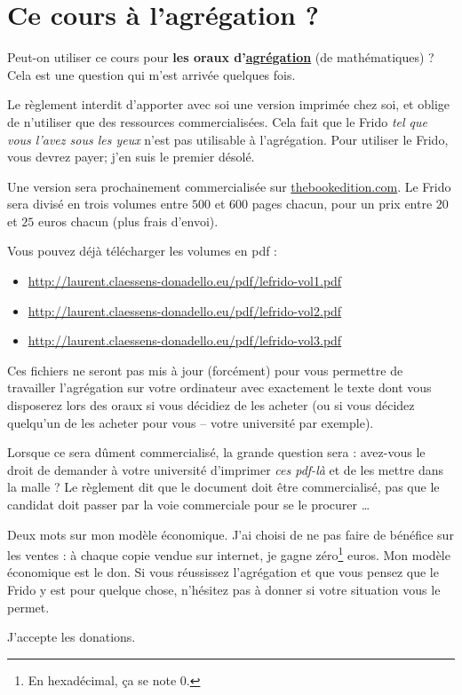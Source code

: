 
\section*{Ce cours à l'agrégation ?}

Peut-on utiliser ce cours pour \textbf{les oraux d'\href{http://agreg.org/}{agrégation}} (de mathématiques) ?  Cela est une question qui m'est arrivée quelques fois.  

Le règlement interdit d'apporter avec soi une version imprimée chez soi, et oblige de n'utiliser que des ressources commercialisées. Cela fait que le Frido \emph{tel que vous l'avez sous les yeux} n'est pas utilisable à l'agrégation. Pour utiliser le Frido, vous devrez payer; j'en suis le premier désolé.

Une version sera prochainement commercialisée sur \href{http://www.thebookedition.com/fr/}{thebookedition.com}. Le Frido sera divisé en trois volumes entre \( 500\) et \( 600\) pages chacun, pour un prix entre \( 20\) et \( 25\) euros chacun (plus frais d'envoi).

Vous pouvez déjà télécharger les volumes en pdf :
\begin{itemize}
    \item 
 \url{http://laurent.claessens-donadello.eu/pdf/lefrido-vol1.pdf}
    \item 
 \url{http://laurent.claessens-donadello.eu/pdf/lefrido-vol2.pdf}
    \item 
 \url{http://laurent.claessens-donadello.eu/pdf/lefrido-vol3.pdf}
\end{itemize}
Ces fichiers ne seront pas mis à jour (forcément) pour vous permettre de travailler l'agrégation sur votre ordinateur avec exactement le texte dont vous disposerez lors des oraux si vous décidiez de les acheter (ou si vous décidez quelqu'un de les acheter pour vous -- votre université par exemple).

Lorsque ce sera dûment commercialisé, la grande question sera : avez-vous le droit de demander à votre université d'imprimer \emph{ces pdf-là} et de les mettre dans la malle ? Le règlement dit que le document doit être commercialisé, pas que le candidat doit passer par la voie commerciale pour se le procurer \ldots

Deux mots sur mon modèle économique. J'ai choisi de ne pas faire de bénéfice sur les ventes : à chaque copie vendue sur internet, je gagne zéro\footnote{En hexadécimal, ça se note \( 0\).} euros. Mon modèle économique est le don. Si vous réussissez l'agrégation et que vous pensez que le Frido y est pour quelque chose, n'hésitez pas à donner si votre situation vous le permet.

\vfill

J'accepte les donations.

